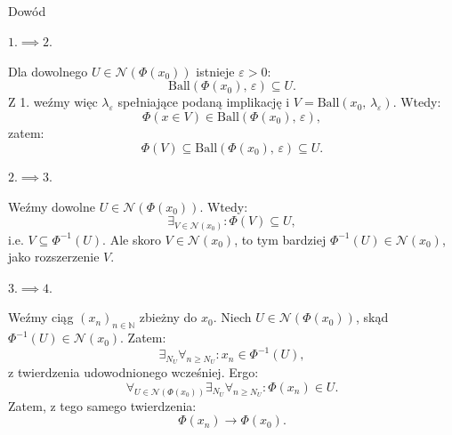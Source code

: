 \documentclass{article}
\numberwithin{defi}{section}
\numberwithin{defi}{section}
\newcommand{\N}{\mathbb{N}}
\newcommand{\Nau}{\mathcal{N}}
\providecommand{\eps}{\varepsilon}
\newcommand{\ciag}[1]{(#1_{n})_{n \in \N}}
\newcommand{\ball}[2]{\text{Ball}(#1, \, #2)}
\begin{document}
\begin{dow}{Dowód}
    \paragraph{$1. \implies 2.$}
    Dla dowolnego $U \in \Nau(\Phi(x_0))$ istnieje $\eps > 0$: \begin{equation*}
        \ball{\Phi(x_0)}{\eps} \subseteq U.
    \end{equation*} Z 1. weźmy więc $\lambda_\eps$ spełniające podaną implikację i $V = \ball{x_0}{\lambda_\eps}$. Wtedy: \begin{equation*}
        \Phi( x \in V) \in \ball{\Phi(x_0)}{\eps},
    \end{equation*} zatem: \begin{equation*}
        \Phi(V) \subseteq \ball{\Phi(x_0)}{\eps} \subseteq U.
    \end{equation*}

    \paragraph{$2. \implies 3.$}
    Weźmy dowolne $U \in \Nau(\Phi(x_0))$. Wtedy: \begin{equation*}
        \exists_{V \in \Nau(x_0)}: \Phi(V) \subseteq U,
    \end{equation*} i.e. $V \subseteq \Phi^{-1}(U)$. Ale skoro $V \in \Nau(x_0)$, to tym bardziej $\Phi^{-1}(U) \in \Nau(x_0)$, jako rozszerzenie $V$.

    \paragraph{$3. \implies 4.$}
    Weźmy ciąg $\ciag{x}$ zbieżny do $x_0$. Niech $U \in \Nau(\Phi(x_0))$, skąd $\Phi^{-1}(U) \in \Nau(x_0)$. Zatem: \begin{equation*}
        \exists_{N_U} \forall_{n \geqslant N_U}: x_n \in \Phi^{-1}(U),
    \end{equation*} z twierdzenia udowodnionego wcześniej. %
    Ergo: \begin{equation*}
        \forall_{U \in \Nau(\Phi(x_0))} \exists_{N_U} \forall_{n \geqslant N_U}: \Phi(x_n) \in U.
    \end{equation*} Zatem, z tego samego twierdzenia: \begin{equation*}
        \Phi(x_n) \to \Phi(x_0).
    \end{equation*}


\end{dow}
\end{document}

